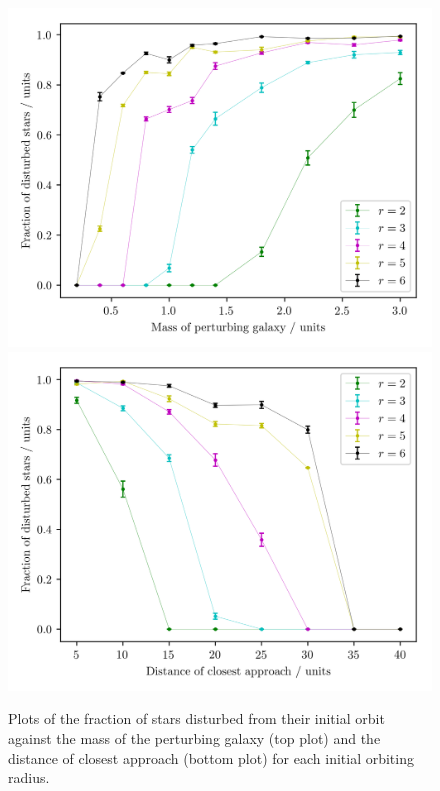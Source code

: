 \documentclass[twoside,twocolumn]{article}
\begin{document}
        \begin{figure}
            \centering
            \includegraphics[width=\linewidth]{images/plot_fraction_mass.png}
            \includegraphics[width=\linewidth]{images/plot_fraction_rmin.png}
            \caption{Plots of the fraction of stars disturbed from their initial orbit against the mass of the perturbing galaxy (top plot) and the distance of closest approach (bottom plot) for each initial orbiting radius.}
            \label{figure:varying_fraction}
        \end{figure}
\end{document}
